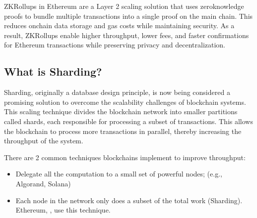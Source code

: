 \documentclass[letterpaper,10pt,english]{jupyterBook}
\begin{document}
\begin{sphinxShadowBox}

\sphinxAtStartPar
ZK\sphinxhyphen{}Rollups in Ethereum are a Layer 2 scaling solution that uses zero\sphinxhyphen{}knowledge proofs to bundle multiple transactions into a single proof on the main chain. This reduces on\sphinxhyphen{}chain data storage and gas costs while maintaining security. As a result, ZK\sphinxhyphen{}Rollups enable higher throughput, lower fees, and faster confirmations for Ethereum transactions while preserving privacy and decentralization.
\end{sphinxShadowBox}


\subsection{What is Sharding?}
\label{\detokenize{SHARDING/sharding:what-is-sharding}}
\sphinxAtStartPar
Sharding, originally a database design principle, is now being considered a promising solution to overcome the scalability challenges of blockchain systems. This scaling technique divides the blockchain network into smaller partitions called shards, each responsible for processing a subset of transactions. This allows the blockchain to process more transactions in parallel, thereby increasing the throughput of the system.

\sphinxAtStartPar
There are 2 common techniques blockchains implement to improve throughput:
\begin{itemize}
\item {} 
\sphinxAtStartPar
Delegate all the computation to a small set of powerful nodes; (e.g., Algorand, Solana)

\item {} 
\sphinxAtStartPar
Each node in the network only does a subset of the total work (Sharding). Ethereum, ,  use this technique.

\end{itemize}
\end{document}
